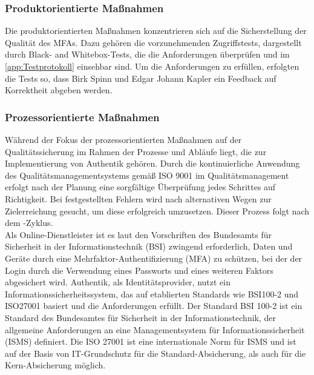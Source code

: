 \subsubsection{Produktorientierte Maßnahmen}
\label{sec:ProduktorientierteMaßnahmen}
Die produktorientierten Maßnahmen konzentrieren sich auf die Sicherstellung der Qualität des \acs{MFA}s. Dazu gehören die 
vorzunehmenden Zugriffstests, dargestellt durch Black- and Whitebox-Tests, die die Anforderungen überprüfen und im 
 \ref{app:Testprotokoll}  einsehbar sind. Um die Anforderungen zu erfüllen, 
erfolgten die Tests so, dass Birk Spinn und Edgar Johann Kapler ein Feedback auf Korrektheit abgeben werden. 

\subsubsection{Prozessorientierte Maßnahmen}
\label{sec:ProzessorientierteMaßnahmen}
Während der Fokus der prozessorientierten Maßnahmen auf der Qualitätssicherung im Rahmen der Prozesse und Abläufe liegt, die zur 
Implementierung von Authentik gehören. 
Durch die kontinuierliche Anwendung des Qualitätsmanagementsystems gemäß ISO 9001 im Qualitätsmanagement erfolgt nach der Planung 
eine sorgfältige Überprüfung jedes Schrittes auf Richtigkeit. Bei festgestellten Fehlern wird nach alternativen Wegen zur 
Zielerreichung gesucht, um diese erfolgreich umzusetzen. Dieser Prozess folgt nach dem \cite{pdca}-Zyklus.
\\Als Online-Dienstleister ist es laut den Vorschriften des Bundesamts für Sicherheit in der Informationstechnik (BSI) 
zwingend erforderlich, Daten und Geräte durch eine Mehrfaktor-Authentifizierung (\acs{MFA}) zu schützen, bei der der Login durch 
die Verwendung eines Passworts und eines weiteren Faktors abgesichert wird. Authentik, als Identitätsprovider, nutzt ein 
Informationssicherheitssystem, das auf etablierten Standards wie BSI100-2 und ISO27001 basiert und die Anforderungen erfüllt.
Der Standard \acs{BSI} 100-2 ist ein Standard des Bundesamtes für Sicherheit in der Informationstechnik, der allgemeine Anforderungen 
an eine Managementsystem für Informationssicherheit (\acs{ISMS}) definiert. Die ISO 27001 ist eine internationale Norm für \acs{ISMS} 
und ist auf der Basis von IT-Grundschutz für die Standard-Absicherung, als auch für die Kern-Absicherung möglich.